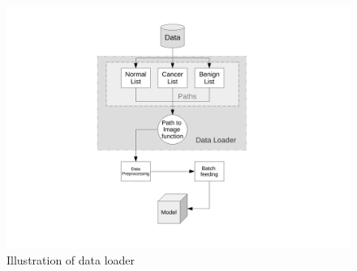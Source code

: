 \documentclass[12pt]{extarticle}
\begin{document}
	 \begin{figure}[h]
	 	\centering
	 	\includegraphics[width=1\textwidth]{pics/Figures/Data_loader.pdf}
	 	\caption{\small{Illustration of data loader}}
	 	\label{fig:Data_loader}
	 \end{figure}
	
\end{document}
